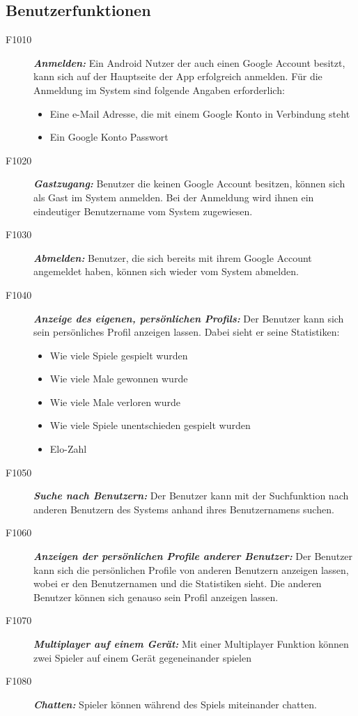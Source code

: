 \documentclass[parskip=full]{scrartcl}
\begin{document}
\subsection{Benutzerfunktionen}
\begin{description}
	\item[F1010] \textbf{\textit{Anmelden: }} Ein \gls{Android} Nutzer der auch einen Google Account besitzt, kann sich auf der Hauptseite der App erfolgreich anmelden. Für die Anmeldung im System sind folgende Angaben erforderlich:
	\begin{itemize}
		\item Eine e-Mail Adresse, die mit einem Google Konto in Verbindung steht
		\item Ein Google Konto Passwort 
	\end{itemize}  
	\item[F1020] \textbf{\textit{Gastzugang: }} Benutzer die keinen Google Account besitzen, können sich als Gast im System anmelden. Bei der Anmeldung wird ihnen ein eindeutiger Benutzername vom System zugewiesen. 
	\item[F1030] \textbf{\textit{Abmelden: }} Benutzer, die sich bereits mit ihrem Google Account angemeldet haben, können sich wieder vom System abmelden.
	
	\item [F1040] \textbf{\textit{Anzeige des eigenen, persönlichen Profils: }}  Der Benutzer kann sich sein persönliches Profil anzeigen lassen. Dabei sieht er seine Statistiken:

	\begin{itemize}
		\item Wie viele Spiele gespielt wurden
		\item Wie viele Male gewonnen wurde
		\item Wie viele Male verloren wurde
		\item Wie viele Spiele unentschieden gespielt wurden
		\item \gls{Elo}-Zahl
		
	\end{itemize}
	\item[F1050] \textbf{\textit{Suche nach Benutzern: }} Der Benutzer kann mit der Suchfunktion nach anderen Benutzern des Systems anhand ihres Benutzernamens suchen.
	
	\item[F1060]  \textbf{\textit{Anzeigen der persönlichen Profile anderer Benutzer: }}
	Der Benutzer kann sich die persönlichen Profile von anderen Benutzern anzeigen lassen, wobei er den Benutzernamen und die Statistiken sieht. Die anderen Benutzer können sich genauso sein Profil anzeigen lassen.
	
	\item[F1070] \textbf{\textit{Multiplayer auf einem Gerät: }}  Mit einer Multiplayer Funktion können zwei Spieler auf einem Gerät gegeneinander spielen
	
	\item[F1080] \textbf{\textit{Chatten: }} Spieler können während des Spiels miteinander chatten.	
	
\end{description}
\end{document}
